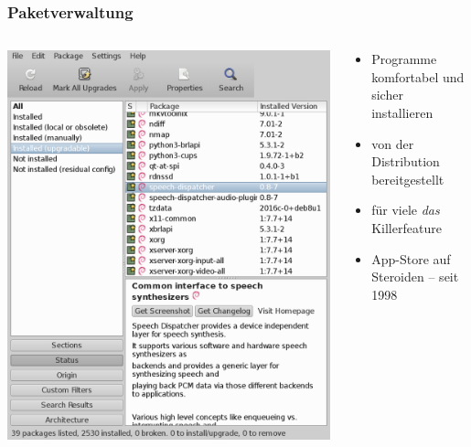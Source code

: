 \documentclass[t]{beamer}
\begin{document}
\begin{frame}
  \frametitle{Paketverwaltung}
  \begin{columns}
    \begin{column}[T]{0.45\textwidth}
      \includegraphics[width=\textwidth]{img-src/pkg-manager.png}
    \end{column}
    \begin{column}{0.45\textwidth}
      \begin{itemize}
      \item Programme komfortabel und sicher installieren
      \item von der Distribution bereitgestellt
      \item für viele \emph{das} Killerfeature
      \item App-Store auf Steroiden – seit 1998
      \end{itemize}
    \end{column}
  \end{columns}
\end{frame}
\end{document}
